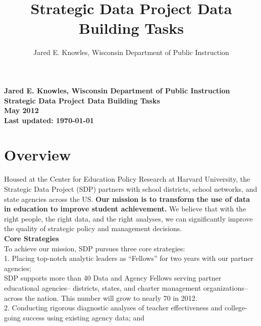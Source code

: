 \documentclass[12pt]{article}
\begin{document}

\title{Strategic Data Project Data Building Tasks}
\author{Jared E. Knowles, Wisconsin Department of Public Instruction}
\pagestyle{plain}
\setcounter{page}{1}
\graphicspath{{./img/}}

\begin{flushright}
\textbf{Jared E. Knowles, Wisconsin Department of Public Instruction}\\
\textbf{Strategic Data Project Data Building Tasks}\\
\textbf{May 2012}\\
\textbf{Last updated: \today}\\
\end{flushright}

\vspace{5mm}




\section{Overview}
Housed at the Center for Education Policy Research at Harvard University, the Strategic Data Project (SDP) partners with 
school districts, school networks, and state agencies across the US. \textbf{Our mission is to transform the use of data in education to 
improve student achievement.} We believe that with the right people, the right data, and the right analyses, we can significantly 
improve the quality of strategic policy and management decisions. \\

\noindent \textbf{Core Strategies} \\
To achieve our mission, SDP pursues three core strategies: \\
\vspace{-12pt}
1. Placing top-notch analytic leaders as ``Fellows'' for two years with our partner agencies; \\

{\small SDP supports more than 40 Data and Agency Fellows serving partner educational agencies--
districts, states, and charter management organizations--across the nation.  This number will grow to nearly 70 in 2012.} \\

2. Conducting rigorous diagnostic analyses of teacher effectiveness and college-going success using existing agency data; and \\
\end{document}
